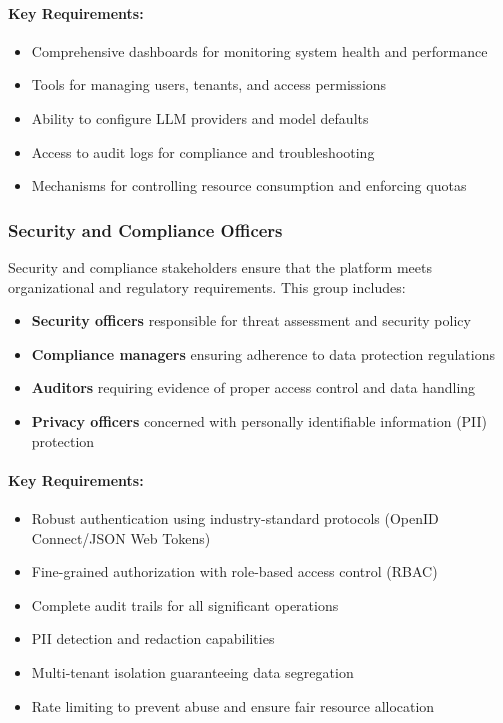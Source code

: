 \documentclass[a4paper,twoside]{sapthesis}
\begin{document}
\paragraph{Key Requirements:}
\begin{itemize}
    \item Comprehensive dashboards for monitoring system health and performance
    \item Tools for managing users, tenants, and access permissions
    \item Ability to configure LLM providers and model defaults
    \item Access to audit logs for compliance and troubleshooting
    \item Mechanisms for controlling resource consumption and enforcing quotas
\end{itemize}

\subsubsection{Security and Compliance Officers}

Security and compliance stakeholders ensure that the platform meets organizational and regulatory requirements. This group includes:

\begin{itemize}
    \item \textbf{Security officers} responsible for threat assessment and security policy
    \item \textbf{Compliance managers} ensuring adherence to data protection regulations
    \item \textbf{Auditors} requiring evidence of proper access control and data handling
    \item \textbf{Privacy officers} concerned with personally identifiable information (PII) protection
\end{itemize}

\paragraph{Key Requirements:}
\begin{itemize}
    \item Robust authentication using industry-standard protocols (OpenID Connect/JSON Web Tokens)
    \item Fine-grained authorization with role-based access control (RBAC)
    \item Complete audit trails for all significant operations
    \item PII detection and redaction capabilities
    \item Multi-tenant isolation guaranteeing data segregation
    \item Rate limiting to prevent abuse and ensure fair resource allocation
\end{itemize}
\end{document}
